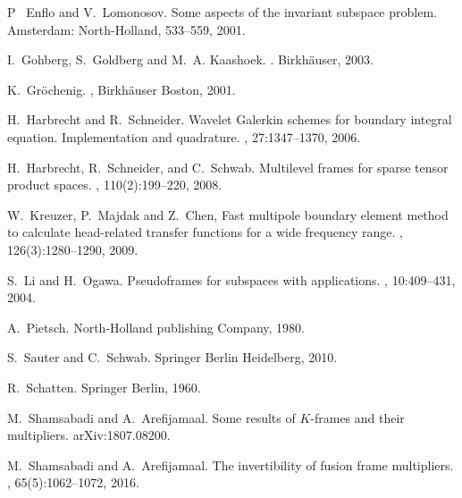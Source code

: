 \documentclass{birkjour}
\theoremstyle{definition}
\theoremstyle{remark}
\numberwithin{equation}{section}
\begin{document}
\begin{thebibliography}{10}
P~ Enflo and V.~Lomonosov.
\newblock Some aspects of the invariant subspace
  problem.
\newblock Amsterdam: North-Holland,  533--559, 2001.



I.~Gohberg, S.~Goldberg and M.~A. Kaashoek.
.
\newblock Birkh{\"a}user, 2003.



K.~Gr{\"o}chenig.
 ,
  Birkh{\"a}user Boston, 2001.

  
  
H.~Harbrecht and R.~Schneider.
\newblock Wavelet Galerkin schemes for boundary integral equation. 
Implementation and quadrature.
, 27:1347--1370, 2006.



H.~Harbrecht, R.~Schneider, and C.~Schwab.
\newblock Multilevel frames for sparse tensor product spaces.
, 110(2):199--220, 2008.



W.~Kreuzer, P.~Majdak and Z.~Chen,
 \newblock Fast multipole boundary element
  method to calculate head-related transfer functions for a wide frequency
  range.
 , 126(3):1280--1290, 2009.


S.~Li and H.~Ogawa.
\newblock Pseudoframes for subspaces with applications.
, 10:409--431, 2004.


A.~Pietsch.
\newblock North-Holland publishing Company, 1980.



S.~Sauter and C.~Schwab.
\newblock Springer Berlin Heidelberg, 2010.


R.~Schatten.
\newblock Springer Berlin, 1960.


M.~Shamsabadi and A.~Arefijamaal.
\newblock Some results of $K$-frames and their multipliers.
\newblock arXiv:1807.08200.


M.~Shamsabadi and A.~Arefijamaal.
\newblock The invertibility of fusion frame multipliers.
, 65(5):1062--1072, 2016.






\end{thebibliography}
\end{document}
